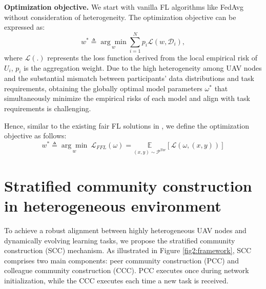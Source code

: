 \documentclass[lettersize,journal]{IEEEtran}
\begin{document}
\textbf{Optimization objective.} We start with vanilla FL algorithms like FedAvg \cite{li2019convergence-fedavg} without consideration of heterogeneity. The optimization objective can be expressed as: 
\begin{equation}
    w^{*}\triangleq \underset{w}{\arg \min } \sum_{i=1}^N p_i\mathcal{L}\left(w, \mathcal{D}_{i}\right) ,
\end{equation}
where $\mathcal{L}(.)$ represents the loss function derived from the local empirical risk of $U_i$, $p_i$ is the aggregation weight. Due to the high heterogeneity among UAV nodes and the substantial mismatch between participants' data distributions and task requirements, obtaining the globally optimal model parameters $\omega^{*}$ that simultaneously minimize the empirical risks of each model and align with task requirements is challenging. %

Hence, similar to the existing fair FL solutions in \cite{mohri2019agnostic,zhang2020fairfl,ezzeldin2023fairfed}, we define the optimization objective as follows:
\begin{equation}
    w^{*}\triangleq \underset{w}{\arg \min } \ \mathcal{L}_{FFL}(\omega)=\underset{(x, y) \sim \mathcal{P}^{Tar}}{\mathbb{E}}[\mathcal{L}{(\omega,(x, y))}]
\end{equation}




\section{Stratified community construction in heterogeneous environment}\label{sec:community}
To achieve a robust alignment between highly heterogeneous UAV nodes and dynamically evolving learning tasks, we propose the stratified community construction (SCC) mechanism. As illustrated in Figure \ref{fig2:framework}, SCC comprises two main components: peer community construction (PCC) and colleague community construction (CCC). PCC executes once during network initialization, while the CCC executes each time a new task is received.
\end{document}
